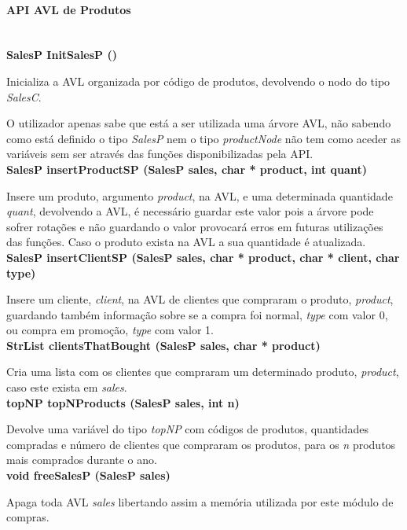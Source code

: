 \documentclass[10pt] {article}
\begin{document}
\paragraph{API AVL de Produtos}\mbox{}\\
\textbf {SalesP InitSalesP ()}
 \par Inicializa a AVL organizada por código de produtos, devolvendo o nodo do tipo \emph{SalesC}.
 \par O utilizador apenas sabe que está a ser utilizada uma árvore AVL, não sabendo como está definido o tipo
 \emph{SalesP} nem o tipo \emph{productNode} não tem como aceder as variáveis sem ser através das funções
 disponibilizadas pela API. \\

\noindent \textbf {SalesP insertProductSP (SalesP sales, char * product, int quant)}
\par Insere um produto, argumento \emph{product}, na AVL, e uma determinada quantidade \emph{quant},
devolvendo a AVL, é necessário guardar este valor pois a árvore pode sofrer rotações e não guardando o valor
provocará erros em futuras utilizações das funções. Caso o produto exista na AVL a sua quantidade é atualizada.\\

\noindent \textbf {SalesP insertClientSP (SalesP sales, char * product, char * client, char type)}
\par Insere um cliente, \emph{client}, na AVL de clientes que compraram o produto, \emph{product}, guardando
também informação sobre se a compra foi normal, \emph{type} com valor 0, ou compra em promoção,
\emph{type} com valor 1.\\

\noindent \textbf {StrList clientsThatBought (SalesP sales, char * product)}
\par Cria uma lista com os clientes que compraram um determinado produto, \emph{product}, caso este exista em
\emph{sales}.\\

\noindent \textbf {topNP topNProducts (SalesP sales, int n)}
\par Devolve uma variável do tipo \emph{topNP} com códigos de produtos, quantidades compradas e número de
clientes que compraram os produtos, para os \emph{n} produtos mais comprados durante o ano.\\

\noindent \textbf {void freeSalesP (SalesP sales)}
\par Apaga toda AVL \emph{sales} libertando assim a memória utilizada por este módulo de compras.\\
\end{document}

